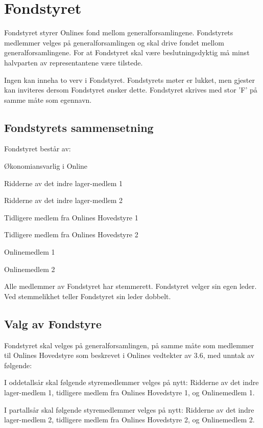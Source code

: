 \chapter{Fondstyret}
\vsapce{23pt}

Fondstyret styrer Onlines fond mellom generalforsamlingene. Fondstyrets medlemmer velges på generalforsamlingen og skal drive fondet mellom generalforsamlingene. For at Fondstyret skal være beslutningsdyktig må minst halvparten av representantene være tilstede.

Ingen kan inneha to verv i Fondstyret. Fondstyrets møter er lukket, men gjester kan inviteres dersom Fondstyret ønsker dette. Fondstyret skrives med stor ’F’ på samme måte som egennavn.

\section{Fondstyrets sammensetning}


Fondstyret består av:

\begin{liste}
  \item Økonomiansvarlig i Online
  \item Ridderne av det indre lager-medlem 1
  \item Ridderne av det indre lager-medlem 2
  \item Tidligere medlem fra Onlines Hovedstyre 1
  \item Tidligere medlem fra Onlines Hovedstyre 2
  \item Onlinemedlem 1
  \item Onlinemedlem 2
\end{liste}

Alle medlemmer av Fondstyret har stemmerett. Fondstyret velger sin egen leder. Ved stemmelikhet teller Fondstyret sin leder dobbelt.

\section{Valg av Fondstyre}


Fondstyret skal velges på generalforsamlingen, på samme måte som medlemmer til Onlines Hovedstyre som beskrevet i Onlines vedtekter av 3.6, med unntak av følgende:

I oddetallsår skal følgende styremedlemmer velges på nytt: Ridderne av det indre lager-medlem 1, tidligere medlem fra Onlines Hovedstyre 1, og Onlinemedlem 1.

I partallsår skal følgende styremedlemmer velges på nytt: Ridderne av det indre lager-medlem 2, tidligere medlem fra Onlines Hovedstyre 2, og Onlinemedlem 2.

